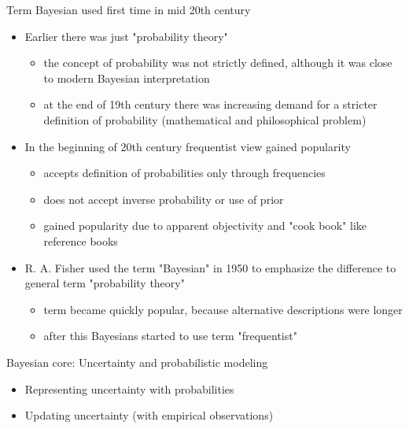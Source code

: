 \documentclass[10pt]{beamer}
\begin{document}
\begin{frame}{Term Bayesian used first time in mid 20th century}

  \begin{itemize}
  \item Earlier there was just "probability theory"
    \begin{itemize}
    \item the concept of probability was not strictly defined,
      although it was close to modern Bayesian interpretation
    \item at the end of 19th century there was increasing demand
      for a stricter definition of probability (mathematical and
      philosophical problem)
    \end{itemize}
    \pause
    \item In the beginning of 20th century frequentist view gained popularity
    \begin{itemize}
    \item accepts definition of probabilities only through frequencies
    \item does not accept inverse probability or use of prior
    \item gained popularity due to apparent objectivity and "cook
      book" like reference books
    \end{itemize}
    \pause
    \item R. A. Fisher used the term "Bayesian" in 1950 to
      emphasize the difference to general
      term "probability theory"
      \begin{itemize}
      \item term became quickly popular, because alternative
        descriptions were longer
         \pause
      \item after this Bayesians started to use term "frequentist"
    \end{itemize}
\end{itemize}
\end{frame}

\begin{frame}{Bayesian core: Uncertainty and probabilistic modeling}

  \begin{itemize}
  \item Representing uncertainty with probabilities
    \vspace{\baselineskip}
  \item Updating uncertainty (with empirical observations)
   \end{itemize}
\end{frame}
\end{document}

